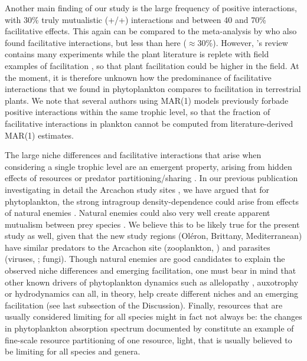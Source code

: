 \documentclass[10pt]{article}
\begin{document}
Another main finding of our study is the large frequency of positive
interactions, with 30\% truly mutualistic (+/+) interactions and between
40 and 70\% facilitative effects. This again can be compared to the
meta-analysis by \citet{adler_competition_2018} who also found facilitative
interactions, but less than here ($\approx$30\%). However, \citet{adler_competition_2018}'s
review contains many experiments while the plant literature is replete
with field examples of facilitation \citep{brooker_facilitation_2008,mcintire2014facilitation},
so that plant facilitation could be higher in the field. At the moment,
it is therefore unknown how the predominance of facilitative interactions
that we found in phytoplankton compares to facilitation in terrestrial
plants. We note that several authors using MAR(1) models previously
forbade positive interactions within the same trophic level, so that
the fraction of facilitative interactions in plankton cannot be computed
from literature-derived MAR(1) estimates.

The large niche differences and facilitative interactions that arise
when considering a single trophic level are an emergent property,
arising from hidden effects of resources or predator partitioning/sharing
\citep{chesson_updates_2018}. In our previous publication investigating
in detail the Arcachon study sites \citep{barraquand_coastal_2018},
we have argued that for phytoplankton, the strong intragroup density-dependence
could arise from effects of natural enemies \citep{haydon_pivotal_1994,barraquand_coastal_2018}.
Natural enemies could also very well create apparent mutualism between
prey species \citep{abrams_apparent_1998,barraquand_indirect_2015,de_ruiter_emergent_2017}.
We believe this to be likely true for the present study as well, given
that the new study regions (Oléron, Brittany, Mediterranean) have
similar predators to the Arcachon site (zooplankton, \citealp[e.g.,][]{jamet_zooplankton_2001,moderan_zooplankton_2010,tortajada_network_2012})
and parasites (viruses, \citealp[e.g.,][]{ory_pelagic_2010};
fungi). Though natural enemies are good candidates to explain the
observed niche differences and emerging facilitation, one must bear
in mind that other known drivers of phytoplankton dynamics such as
allelopathy \citep{felpeto_allelopathy_2018}, auxotrophy \citep{tang_most_2010}
or hydrodynamics \citep{levy_role_2018} can all, in theory, help
create different niches and an emerging facilitation (see last subsection
of the Discussion). Finally, resources that are usually considered
limiting for all species might in fact not always be: the changes
in phytoplankton absorption spectrum documented by \citet{burson_competition_2018}
constitute an example of fine-scale resource partitioning of one resource,
light, that is usually believed to be limiting for all species and
genera.
\end{document}
